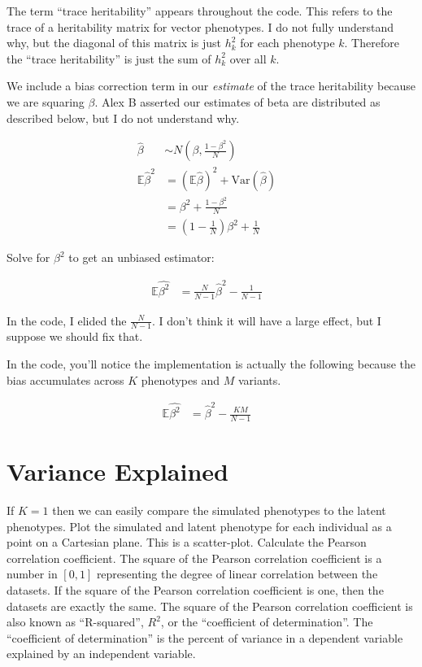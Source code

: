 \documentclass{article}
\newcommand{\E}{\mathbb{E}}
\begin{document}
The term ``trace heritability'' appears throughout the code. This refers to the trace of a
heritability matrix for vector phenotypes. I do not fully understand why, but the diagonal of this
matrix is just $h^2_k$ for each phenotype $k$. Therefore the ``trace heritability'' is just the sum
of $h^2_k$ over all $k$.

We include a bias correction term in our \emph{estimate} of the trace heritability because we are
squaring $\beta$. Alex B asserted our estimates of beta are distributed as described below, but I do
not understand why.

\begin{align*}
\widehat{\beta} &\sim N\left(\beta, \frac{1 - \beta^2}{N}\right) &\\
\E \widehat{\beta}^2 &= (\E \widehat{\beta})^2 + \text{Var}(\widehat{\beta}) &\\
           &= \beta^2 + \frac{1 - \beta^2}{N} &\\
           &= \left(1 - \frac{1}{N}\right)\beta^2 + \frac{1}{N} &
\end{align*}

Solve for $\beta^2$ to get an unbiased estimator:

\begin{align*}
\E \widehat{\beta^2} &= \frac{N}{N - 1}\widehat{\beta}^2 - \frac{1}{N - 1}&
\end{align*}

In the code, I elided the $\frac{N}{N - 1}$. I don't think it will have a large effect, but I
suppose we should fix that.

In the code, you'll notice the implementation is actually the following because the bias accumulates
across $K$ phenotypes and $M$ variants.

\begin{align*}
\E \widehat{\beta^2} &= \widehat{\beta}^2 - \frac{KM}{N - 1}&
\end{align*}



\section{Variance Explained}

If $K = 1$ then we can easily compare the simulated phenotypes to the latent phenotypes. Plot the
simulated and latent phenotype for each individual as a point on a Cartesian plane. This is a
scatter-plot. Calculate the Pearson correlation coefficient. The square of the Pearson correlation
coefficient is a number in $[0, 1]$ representing the degree of linear correlation between the
datasets. If the square of the Pearson correlation coefficient is one, then the datasets are exactly
the same. The square of the Pearson correlation coefficient is also known as ``R-squared'', $R^2$,
or the ``coefficient of determination''. The ``coefficient of determination'' is the percent of
variance in a dependent variable explained by an independent variable.
\end{document}
